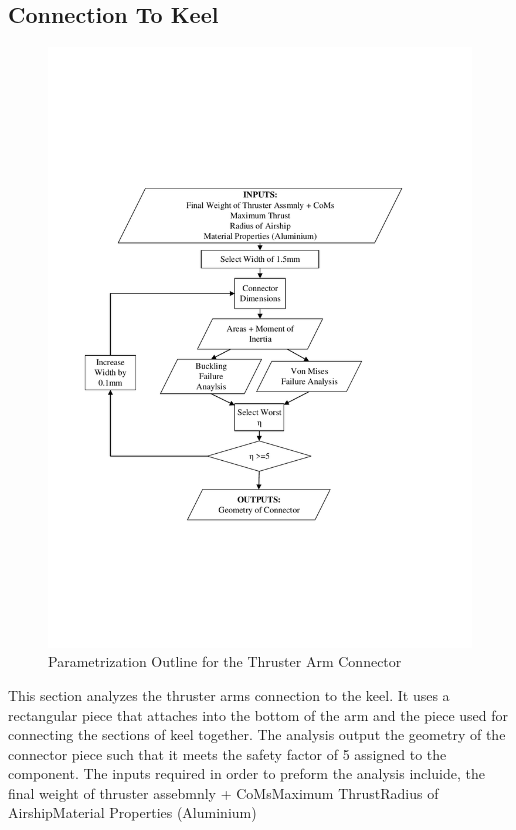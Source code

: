 \documentclass[../main.tex]{subfiles}
\begin{document}
\subsection{Connection To Keel} \label{connector}
\begin{figure}[H]
	\centering
	\includegraphics[width=.9\linewidth]{img/paramaterization/connector.pdf}
	\caption{Parametrization Outline for the Thruster Arm Connector}
	\label{fig:connectorParametrization}
\end{figure}

This section analyzes the thruster arms connection to the keel. It uses a rectangular piece that attaches into the bottom of the arm and the piece used for connecting the sections of keel together. The analysis output the geometry of the connector piece such that it meets the safety factor of 5 assigned to the component. The inputs required in order to preform the analysis incluide, the final weight of thruster assebmnly + CoMsMaximum ThrustRadius of AirshipMaterial Properties (Aluminium)
\end{document}
